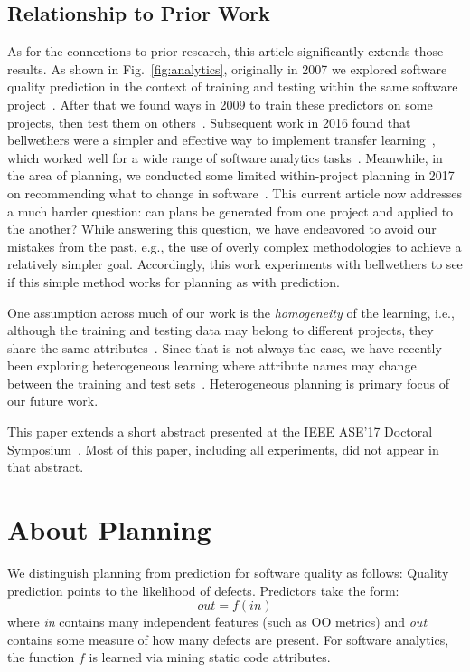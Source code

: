 \documentclass[smallextended]{svjour3}       %
\newcommand{\fig}[1]{Fig.~\ref{fig:#1}}
\begin{document}
 



\subsection{Relationship to Prior Work}
\label{sect:our_prior}
As for the connections to prior research, this article significantly extends those results.
As shown in \fig{analytics}, originally in 2007 we explored software quality prediction in the context of training and testing within the same software project~\cite{menzies07}. After that we found ways in 2009 to train these predictors on some projects, then test them on others~\cite{turhan09}. Subsequent work in 2016 found that bellwethers were a simpler and effective way to implement transfer learning~\cite{krishna16}, which worked well for a wide range of software analytics tasks~\cite{krishna17b}. Meanwhile, in the area of planning, we conducted some limited within-project planning in 2017 on recommending what to change in software~\cite{krishna17a}. This current article now addresses a much harder question: can plans be generated from one project and applied to the another? While answering this question, we have endeavored to avoid our mistakes from the past, e.g., the use of overly complex methodologies to achieve a relatively simpler goal. Accordingly, this work experiments with bellwethers to see if this simple method works for planning as with prediction. 

One assumption across much of our work is the \textit{homogeneity} of the learning, i.e., although the training and testing data may belong to different projects, they share the same attributes~\cite{krishna16, krishna17a, krishna17b, menzies07, turhan09}. Since that is not always the case, we have recently been exploring heterogeneous learning where attribute names may change between the training and test sets~\cite{fu18}. Heterogeneous planning is primary focus of our future work.

This paper extends a short  abstract presented at the IEEE ASE'17 Doctoral Symposium~\cite{krishna2017b}. Most of this paper, including all experiments, did not appear in that abstract.



\section{About Planning}
\label{sect:motivate}

We distinguish planning from prediction for software quality as follows: 
Quality prediction points to the likelihood of defects. Predictors take the form:
\begin{equation*}
  out = f(in)  
\end{equation*}
where {\em in} contains many independent features (such as OO metrics) and {\em out} contains some measure of
how many defects are present. For software analytics, the function $f$ is learned via mining static code attributes.
\end{document}
